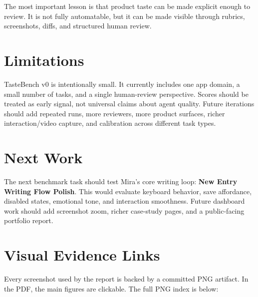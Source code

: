 \documentclass[11pt]{article}
\begin{document}
The most important lesson is that product taste can be made explicit enough to review. It is not fully automatable, but it can be made visible through rubrics, screenshots, diffs, and structured human review.

\section{Limitations}

TasteBench v0 is intentionally small. It currently includes one app domain, a small number of tasks, and a single human-review perspective. Scores should be treated as early signal, not universal claims about agent quality. Future iterations should add repeated runs, more reviewers, more product surfaces, richer interaction/video capture, and calibration across different task types.

\section{Next Work}

The next benchmark task should test Mira's core writing loop: \textbf{New Entry Writing Flow Polish}. This would evaluate keyboard behavior, save affordance, disabled states, emotional tone, and interaction smoothness. Future dashboard work should add screenshot zoom, richer case-study pages, and a public-facing portfolio report.


\section{Visual Evidence Links}

Every screenshot used by the report is backed by a committed PNG artifact. In the PDF, the main figures are clickable. The full PNG index is below:
\end{document}
